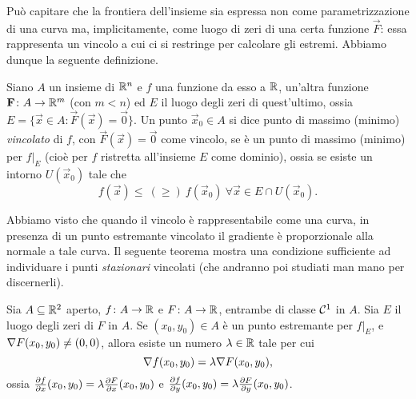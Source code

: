 Può capitare che la frontiera dell'insieme sia espressa non come parametrizzazione di una curva ma, implicitamente, come luogo di zeri di una certa funzione $\vec F$: essa rappresenta un vincolo a cui ci si restringe per calcolare gli estremi.
Abbiamo dunque la seguente definizione.
\begin{definizione} \label{d:estremi-vincolati}
	Siano $A$ un insieme di $\mathbb{R}^n$ e $f$ una funzione da esso a $\mathbb{R}$, un'altra funzione $\mathbf{F}\colon A\to\mathbb{R}^m$ (con $m<n$) ed $E$ il luogo degli zeri di quest'ultimo, ossia $E=\{\vec x\in A\colon \vec F(\vec x)=\vec 0\}$.
	Un punto $\vec x_0\in A$ si dice punto di massimo (minimo) \emph{vincolato} di $f$, con $\vec F(\vec x)=\vec 0$ come vincolo, se è un punto di massimo (minimo) per $f|_E$ (cioè per $f$ ristretta all'insieme $E$ come dominio), ossia se esiste un intorno $U(\vec x_0)$ tale che
	\begin{equation*}
		f(\vec x)\leq\ (\geq)\ f(\vec x_0)\ \forall\vec x\in E\cap U(\vec x_0).
	\end{equation*}
\end{definizione}
Abbiamo visto che quando il vincolo è rappresentabile come una curva, in presenza di un punto estremante vincolato il gradiente è proporzionale alla normale a tale curva.
Il seguente teorema mostra una condizione sufficiente ad individuare i punti \emph{stazionari} vincolati (che andranno poi studiati man mano per discernerli).
\begin{teorema} \label{t:moltiplicatori-lagrange-R2}
	Sia $A\subseteq\mathbb{R}^2$ aperto, $f\colon A\to\mathbb{R}$ e $F\colon A\to\mathbb{R}$, entrambe di classe $\mathcal{C}^{{1}}$ in $A$. Sia $E$ il luogo degli zeri di $F$ in $A$. Se $(x_0,y_0)\in A$ è un punto estremante per $f|_E$, e $\nabla F(x_0,y_0)\neq(0,0)$, allora esiste un numero $\lambda\in\mathbb{R}$ tale per cui
	\begin{equation} 
		\nabla f(x_0,y_0)=\lambda\nabla F(x_0,y_0),
		\label{eq:moltiplicatori-lagrange-R2}
	\end{equation}
	ossia $\frac{\partial {f}}{\partial {x}}(x_0,y_0)=\lambda\frac{\partial {F}}{\partial {x}}(x_0,y_0)$ e $\frac{\partial {f}}{\partial {y}}(x_0,y_0)=\lambda\frac{\partial {F}}{\partial {y}}(x_0,y_0)$.
\end{teorema}
